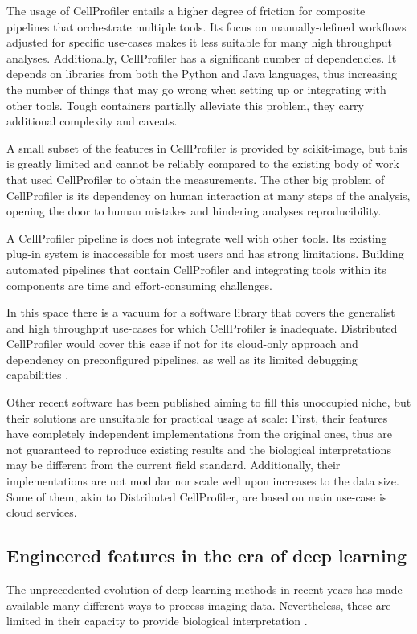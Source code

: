 \documentclass{article}
\begin{document}
The usage of CellProfiler entails a higher degree of friction for composite pipelines that orchestrate multiple tools. Its focus on manually-defined workflows adjusted for specific use-cases makes it less suitable for many high throughput analyses. Additionally, CellProfiler has a significant number of dependencies. It depends on libraries from both the Python and Java languages, thus increasing the number of things that may go wrong when setting up or integrating with other tools. Tough containers partially alleviate this problem, they carry additional complexity and caveats.

A small subset of the features in CellProfiler is provided by scikit-image, but this is greatly limited and cannot be reliably compared to the existing body of work that used CellProfiler to obtain the measurements. The other big problem of CellProfiler is its dependency on human interaction at many steps of the analysis, opening the door to human mistakes and hindering analyses reproducibility.

A CellProfiler pipeline is does not integrate well with other tools. Its existing plug-in system is inaccessible for most users and has strong limitations. Building automated pipelines that contain CellProfiler and integrating tools within its components are time and effort-consuming challenges.

In this space there is a vacuum for a software library that covers the generalist and high throughput use-cases for which CellProfiler is inadequate. Distributed CellProfiler would cover this case if not for its cloud-only approach and dependency on preconfigured pipelines, as well as its limited debugging capabilities \citep{mcquinCellProfiler30Nextgeneration2018}.

Other recent software has been published aiming to fill this unoccupied niche, but their solutions are unsuitable for practical usage at scale: First, their features have completely independent implementations from the original ones, thus are not guaranteed to reproduce existing results and the biological interpretations may be different from the current field standard. Additionally, their implementations are not modular nor scale well upon increases to the data size. Some of them, akin to Distributed CellProfiler, are based on main use-case is cloud services.
\subsection{Engineered features in the era of deep learning}
\label{sec:org9dc3dfa}
The unprecedented evolution of deep learning methods in recent years has made available many different ways to process imaging data. Nevertheless, these are limited in their capacity to provide biological interpretation \citep{moenDeepLearningCellular2019}.
\end{document}
